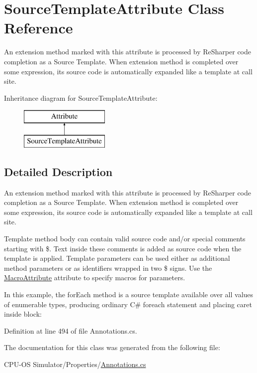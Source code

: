 \hypertarget{class_source_template_attribute}{}\section{Source\+Template\+Attribute Class Reference}
\label{class_source_template_attribute}


An extension method marked with this attribute is processed by Re\+Sharper code completion as a \textquotesingle{}Source Template\textquotesingle{}. When extension method is completed over some expression, it\textquotesingle{}s source code is automatically expanded like a template at call site.  


Inheritance diagram for Source\+Template\+Attribute\+:\begin{figure}[H]
\begin{center}
\leavevmode
\includegraphics[height=2.000000cm]{class_source_template_attribute}
\end{center}
\end{figure}


\subsection{Detailed Description}
An extension method marked with this attribute is processed by Re\+Sharper code completion as a \textquotesingle{}Source Template\textquotesingle{}. When extension method is completed over some expression, it\textquotesingle{}s source code is automatically expanded like a template at call site. 

Template method body can contain valid source code and/or special comments starting with \textquotesingle{}\$\textquotesingle{}. Text inside these comments is added as source code when the template is applied. Template parameters can be used either as additional method parameters or as identifiers wrapped in two \textquotesingle{}\$\textquotesingle{} signs. Use the \hyperlink{class_macro_attribute}{Macro\+Attribute} attribute to specify macros for parameters. 

In this example, the \textquotesingle{}for\+Each\textquotesingle{} method is a source template available over all values of enumerable types, producing ordinary C\# \textquotesingle{}foreach\textquotesingle{} statement and placing caret inside block\+: 
 

Definition at line 494 of file Annotations.\+cs.



The documentation for this class was generated from the following file\+:\begin{DoxyCompactItemize}
\item 
C\+P\+U-\/\+O\+S Simulator/\+Properties/\hyperlink{_annotations_8cs}{Annotations.\+cs}\end{DoxyCompactItemize}
